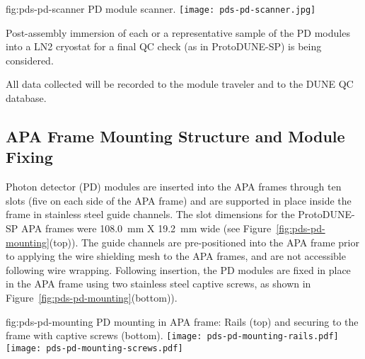 \begin{dunefigure}{fig:pds-pd-scanner}
{PD module scanner.}
  \texttt{[image: pds-pd-scanner.jpg]}
\end{dunefigure}

Post-assembly immersion of each or a representative sample of the PD modules into a LN2 cryostat for a final QC check (as in ProtoDUNE-SP) is being considered.

All data collected will be recorded to the module traveler and to the DUNE QC database.







\subsection{APA Frame Mounting Structure and Module Fixing}	
\label{sec:fdsp-pd-assy-frames}

Photon detector (PD) modules are inserted into the APA frames through ten slots 
(five on each side of the APA frame) and are supported in place inside the frame in 
stainless steel guide channels.  The slot dimensions for the ProtoDUNE-SP APA frames 
were \SI{108.0}{mm} X \SI{19.2}{mm} wide (see Figure~\ref{fig:pds-pd-mounting}(top)).  The guide channels are pre-positioned into 
the APA frame prior to applying the wire shielding mesh to the APA frames, and are
not accessible following wire wrapping. Following insertion, the PD modules are fixed in place in the APA frame using
 two stainless steel captive screws, as shown in Figure~\ref{fig:pds-pd-mounting}(bottom)).


\begin{dunefigure}{fig:pds-pd-mounting}
{PD mounting in APA frame: Rails (top) and securing to the frame with captive screws  (bottom).}
	\texttt{[image: pds-pd-mounting-rails.pdf]}
	\texttt{[image: pds-pd-mounting-screws.pdf]}
\end{dunefigure}




